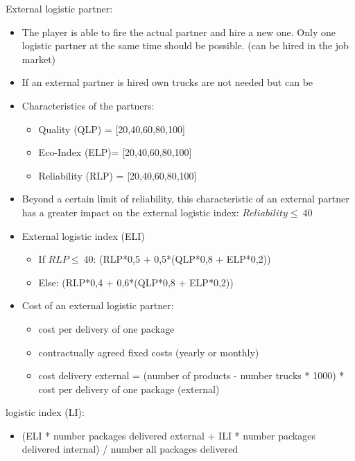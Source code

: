 External logistic partner:
\begin{itemize}
    \item The player is able to fire the actual partner and hire a new one. Only one logistic partner at the same time should be possible. (can be hired in the job market)
    \item If an external partner is hired own trucks are not needed but can be
    \item Characteristics of the partners:
    \begin{itemize}
        \item Quality (QLP) = [20,40,60,80,100]
        \item Eco-Index (ELP)= [20,40,60,80,100]
        \item Reliability (RLP) = [20,40,60,80,100]
    \end{itemize}
    \item Beyond a certain limit of reliability, this characteristic of an external partner has a greater impact on the external logistic index: $Reliability \leq \ $40
    \item External logistic index (ELI)
    \begin{itemize}
        \item If $RLP \leq \ $40: (RLP*0,5 + 0,5*(QLP*0,8 + ELP*0,2))
        \item Else: (RLP*0,4 + 0,6*(QLP*0,8 + ELP*0,2))
    \end{itemize}
    \item Cost of an external logistic partner:
    \begin{itemize}
        \item cost per delivery of one package 
        \item contractually agreed fixed costs (yearly or monthly)
        \item cost delivery external = (number of products - number trucks * 1000) * cost per delivery of one package (external)
    \end{itemize}
\end{itemize}

logistic index (LI):
\begin{itemize}
\item (ELI * number packages delivered external + ILI * number packages delivered internal) / number all packages delivered 
\end{itemize}